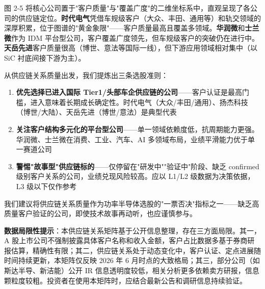 图 2-5 将核心公司置于"客户质量"与"覆盖广度"的二维坐标系中，直观呈现了各公司的供应链定位。\textbf{时代电气}凭借车规级客户（大众、丰田、通用等）和轨交领域的深厚积累，位于图谱的"黄金象限"——客户质量最高且覆盖多领域。\textbf{华润微}和\textbf{士兰微}作为 IDM 平台型公司，客户覆盖广度领先，但车规级客户的突破仍在进行中。\textbf{天岳先进}客户质量很高（博世、意法等国际一线），但下游应用领域相对集中（以 SiC 衬底间接下游为主）。

\begin{keyinsight}[供应链视角下的选股逻辑]
从供应链关系质量出发，我们提炼出三条选股准则：
\vspace{0.3em}
\begin{enumerate}[leftmargin=2em]
\item \textbf{优先选择已进入国际 Tier1/头部车企供应链的公司}——客户认证是最高门槛，进入意味着长期成长确定性。时代电气（大众/丰田/通用）、扬杰科技（博世/大陆）、天岳先进（博世/意法）是典型代表
\item \textbf{关注客户结构多元化的平台型公司}——单一领域依赖度低，抗周期能力更强。华润微、士兰微在消费、工业、汽车、AI 多领域布局，业绩平滑能力优于单一赛道公司
\item \textbf{警惕"故事型"供应链标的}——仅停留在"研发中""验证中"阶段、缺乏 confirmed 级别客户关系的公司，业绩兑现风险较高。应以 L1/L2 级数据为决策依据，L3 级以下仅作参考
\end{enumerate}
\vspace{0.3em}
我们建议将供应链关系质量作为功率半导体选股的"一票否决"指标之一——缺乏高质量客户验证的公司，即使技术故事再动听，也应谨慎参与。
\end{keyinsight}

\vspace{0.3em}

\textbf{数据局限性提示}：本供应链关系矩阵基于公开信息整理，存在三方面局限。其一，A 股上市公司不强制披露具体客户名称和收入金额，客户占比数据多基于券商研报估算，精确性有限；其二，供应链关系处于动态变化中，客户认证、定点进展随时间持续更新，本矩阵仅反映 2026 年 6 月时点的大致格局；其三，部分公司（如斯达半导、新洁能）公开 IR 信息透明度较低，相关分析更多依赖卖方研报，信息颗粒度较粗。投资者在使用本矩阵时，应结合最新公告和调研信息持续验证。
